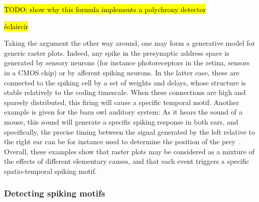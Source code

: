 \documentclass[default]{sn-jnl}%
\theoremstyle{thmstyleone}%
\theoremstyle{thmstyletwo}%
\theoremstyle{thmstylethree}%
\newcommand{\note}[1]{{\sethlcolor{yellow}\hl{#1}}}
\begin{document}
\note{ TODO: show why this formula implements a polychrony detector }

\note{ éclaircir }

Taking the argument the other way around, one may form a generative model for generic raster plots. Indeed, any spike in the presynaptic address space is generated by sensory neurons (for instance photoreceptors in the retina, sensors in a CMOS chip) or by afferent spiking neurons. In the latter case, these are connected to the spiking cell by a set of weights and delays, whose structure is stable relatively to the coding timescale. When these connections are high and sparsely distributed, this firing will cause a specific temporal motif. Another example is given for the barn owl auditory system: As it hears the sound of a mouse, this sound will generate a specific spiking response in both ears, and specifically, the precise timing between the signal generated by the left relative to the right ear can be for instance used to determine the position of the prey~\citep{goodman_spike-timing-based_2010}. Overall, these examples show that raster plots may be considered as a mixture of the effects of different elementary causes, and that each event triggers a specific spatio-temporal spiking motif. 
%
\subsubsection{Detecting spiking motifs}
\end{document}
